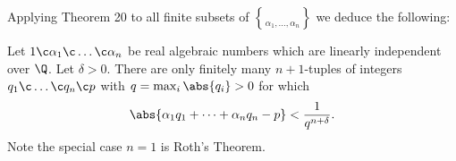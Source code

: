 Applying Theorem 20 to all finite subsets of $\brace{\alpha_1,\dotsc,\alpha_n}$ we deduce the following:

\cor Let $1\c \alpha_1\c \dotsc\c \alpha_n$ be real algebraic numbers which are linearly independent over $\Q$.  Let $\delta>0$.  There are only finitely many $n+1$-tuples of integers $q_1\c \dotsc\c q_n\c p$ with $q=\max_i\abs{q_i}>0$ for which
\[ \abs{\alpha_1q_1+\dotsb+\alpha_nq_n-p} < \frac{1}{q^{n+\delta}} . \]
Note the special case $n=1$ is Roth's Theorem.
